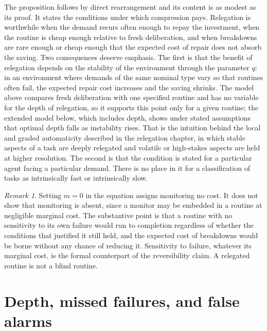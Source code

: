 \documentclass[11pt]{report}
\theoremstyle{remark}
\newtheorem{remark}{Remark}[chapter]
\theoremstyle{definition}
\begin{document}
The proposition follows by direct rearrangement and its content is as modest as its proof. It states the conditions under which compression pays. Relegation is worthwhile when the demand recurs often enough to repay the investment, when the routine is cheap enough relative to fresh deliberation, and when breakdowns are rare enough or cheap enough that the expected cost of repair does not absorb the saving. Two consequences deserve emphasis. The first is that the benefit of relegation depends on the stability of the environment through the parameter $q$: in an environment where demands of the same nominal type vary so that routines often fail, the expected repair cost increases and the saving shrinks. The model above compares fresh deliberation with one specified routine and has no variable for the depth of relegation, so it supports this point only for a given routine; the extended model below, which includes depth, shows under stated assumptions that optimal depth falls as instability rises. That is the intuition behind the local and graded automaticity described in the relegation chapter, in which stable aspects of a task are deeply relegated and volatile or high-stakes aspects are held at higher resolution. The second is that the condition is stated for a particular agent facing a particular demand. There is no place in it for a classification of tasks as intrinsically fast or intrinsically slow.

\begin{remark}
Setting $m=0$ in the equation assigns monitoring no cost. It does not show that monitoring is absent, since a monitor may be embedded in a routine at negligible marginal cost. The substantive point is that a routine with no sensitivity to its own failure would run to completion regardless of whether the conditions that justified it still held, and the expected cost of breakdowns would be borne without any chance of reducing it. Sensitivity to failure, whatever its marginal cost, is the formal counterpart of the reversibility claim. A relegated routine is not a blind routine.
\end{remark}

\section{Depth, missed failures, and false alarms}
\end{document}
